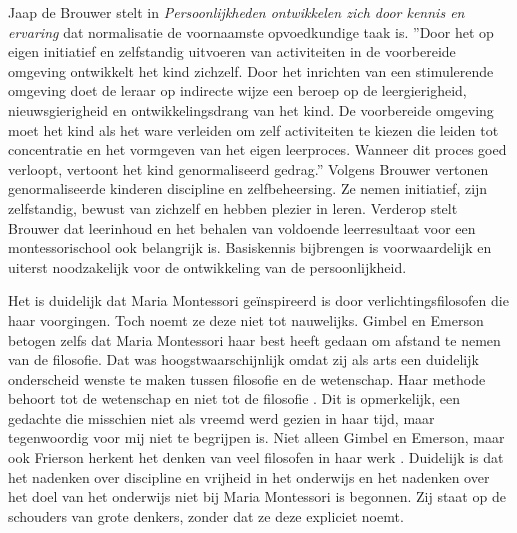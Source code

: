 \documentclass[12pt, a4paper]{article}
\begin{document}
Jaap de Brouwer stelt in \emph{Persoonlijkheden ontwikkelen zich door kennis en ervaring} \cite{Brouwer2021} dat normalisatie de voornaamste opvoedkundige taak is. ''Door het op eigen initiatief en zelfstandig uitvoeren van activiteiten in de voorbereide omgeving ontwikkelt het kind zichzelf. Door het inrichten van een stimulerende omgeving doet de leraar op indirecte wijze een beroep op de leergierigheid, nieuwsgierigheid en ontwikkelingsdrang van het kind. De voorbereide omgeving moet het kind als het ware verleiden om zelf activiteiten te kiezen die leiden tot concentratie en het vormgeven van het eigen leerproces. Wanneer dit proces goed verloopt, vertoont het kind genormaliseerd gedrag.'' \cite[p.60]{Brouwer2021}
Volgens Brouwer vertonen genormaliseerde kinderen discipline en zelfbeheersing. Ze nemen initiatief, zijn zelfstandig, bewust van zichzelf en hebben plezier in leren. Verderop stelt Brouwer dat leerinhoud en het behalen van voldoende leerresultaat voor een montessorischool ook belangrijk is. Basiskennis bijbrengen is voorwaardelijk en uiterst noodzakelijk voor de ontwikkeling van de persoonlijkheid.

Het is duidelijk dat Maria Montessori geïnspireerd is door verlichtingsfilosofen die haar voorgingen. Toch noemt ze deze niet tot nauwelijks. Gimbel en Emerson betogen zelfs dat Maria Montessori haar best heeft gedaan om afstand te nemen van de filosofie. Dat was hoogstwaarschijnlijk omdat zij als arts een duidelijk onderscheid wenste te maken tussen filosofie en de wetenschap. Haar methode behoort tot de wetenschap en niet tot de filosofie \cite[]{Gimbel}. Dit is opmerkelijk, een gedachte die misschien niet als vreemd werd gezien in haar tijd, maar tegenwoordig voor mij niet te begrijpen is. Niet alleen Gimbel en Emerson, maar ook Frierson herkent het denken van veel filosofen in haar werk \cite[]{Frierson}. Duidelijk is dat het nadenken over discipline en vrijheid in het onderwijs en het nadenken over het doel van het onderwijs niet bij Maria Montessori is begonnen. Zij staat op de schouders van grote denkers, zonder dat ze deze expliciet noemt. 
\end{document}
